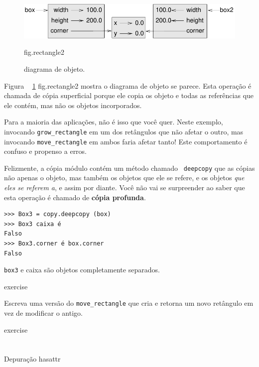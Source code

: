 \documentclass[10pt]{book}
\begin{document}
\begin{exercise}
\begin{v erbatim}
{\begin{figure}
\centerline
{\includegraphics[scale = 0.8] {figs/rectangle2.pdf}}
\caption{diagrama de objeto.}
\label{} fig.rectangle2
\end{figure}

Figura ~ \ref {} fig.rectangle2 mostra o diagrama de objeto se parece.
Esta operação é chamada de {cópia superficial \bf} porque ele copia os
objeto e todas as referências que ele contém, mas não os objetos incorporados.

Para a maioria das aplicações, não é isso que você quer. Neste exemplo,
invocando \verb "grow_rectangle" em um dos retângulos que não
afetar o outro, mas invocando \verb "move_rectangle" em ambos faria
afetar tanto! Este comportamento é confuso e propenso a erros.

Felizmente, a cópia {\tt} módulo contém um método chamado {\tt
deepcopy} que as cópias não apenas o objeto, mas também 
os objetos que ele se refere, e os objetos {\em que eles se referem a},
e assim por diante.
Você não vai se surpreender ao saber que esta operação é
chamado de {\bf cópia profunda}.

\begin{verbatim}
>>> Box3 = copy.deepcopy (box)
>>> Box3 caixa é
Falso
>>> Box3.corner é box.corner
Falso
\end{verbatim}
%
{\tt box3} e {caixa \tt} são objetos completamente separados.


\begin{} exercise

Escreva uma versão do \verb "move_rectangle" que cria e
retorna um novo retângulo em vez de modificar o antigo.

\end{} exercise


\section{} Depuração
\label{} hasattr

}
\end{v erbatim}
\end{exercise}
\end{document}
